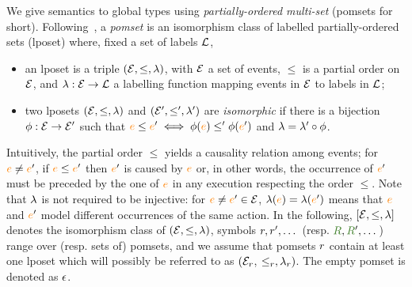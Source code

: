 
We give semantics to global types using \emph{partially-ordered
  multi-set} (pomsets for short).
%
Following~\cite{gaifman1987partial}, a \emph{pomset} is an isomorphism
class of labelled partially-ordered sets (lposet) where, fixed a set
of labels $\mathcal{L}$,
\begin{itemize}
\item an lposet is a triple $(\mathcal{E}, \leq, \lambda)$, with $\mathcal{E}$ a set
  of events, $\leq$ is a partial order on $\mathcal{E}$, and
  $\lambda: \mathcal{E} \rightarrow \mathcal{L}$ a labelling function mapping events
  in $\mathcal{E}$ to labels in $\mathcal{L}$;
\item two lposets $(\mathcal{E}, \leq, \lambda)$ and $(\mathcal{E}', \leq', \lambda')$
  are \emph{isomorphic} if there is a bijection
  $\phi: \mathcal{E} \rightarrow \mathcal{E}'$ such that
  ${\color{orange}{e}} \leq {\color{orange}{e}}' \iff \phi({\color{orange}{e}}) \leq' \phi({\color{orange}{e}}')$ and
  $\lambda = \lambda' \circ \phi$.
\end{itemize}
%
Intuitively, the partial order $\leq$ yields a causality relation
among events; for ${\color{orange}{e}} \neq {\color{orange}{e}}'$, if ${\color{orange}{e}} \leq {\color{orange}{e}}'$ then ${\color{orange}{e}}'$ is
caused by ${\color{orange}{e}}$ or, in other words, the occurrence of ${\color{orange}{e}}'$ must be
preceded by the one of ${\color{orange}{e}}$ in any execution respecting the order
$\leq$.
%
Note that $\lambda$ is not required to be injective: for
${\color{orange}{e}} \neq {\color{orange}{e}}' \in \mathcal{E}$, $\lambda({\color{orange}{e}}) = \lambda({\color{orange}{e}}')$ means that ${\color{orange}{e}}$
and ${\color{orange}{e}}'$ model different occurrences of the same action.
%
In the following, $[\mathcal{E}, \leq, \lambda]$ denotes the isomorphism class
of $(\mathcal{E}, \leq, \lambda)$, symbols $r,r', \dots$ (resp.
$\aR, \aR', \dots$) range over (resp. sets of) pomsets, and we assume
that pomsets $r$ contain at least one lposet which will possibly
be referred to as $(\mathcal{E}_{r}$, $\leq_{r}, \lambda_{r})$.
%
The empty pomset is denoted as $\epsilon$.

